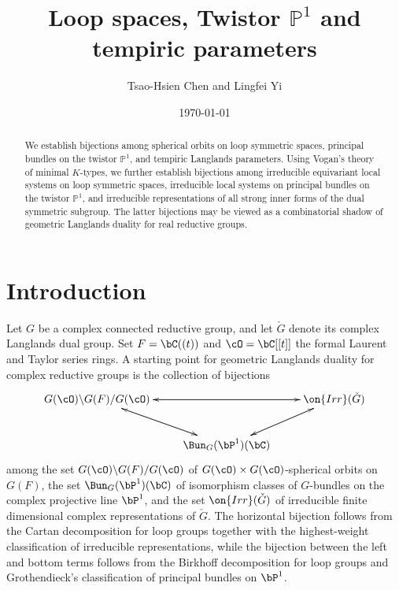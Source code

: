 \documentclass[12pt]{amsart}
\theoremstyle{remark}
\begin{document}
 
\renewcommand{\thepart}{\Roman{part}}

\renewcommand{\partname}{\hspace*{20mm} Part}
	

\title{Loop spaces, Twistor $\mathbb P^1$ and tempiric parameters} 
\date{\today} 




 \author{Tsao-Hsien Chen and Lingfei Yi}

\dedicatory{}


         

\maketitle
\begin{abstract}

We establish bijections among spherical orbits on loop symmetric spaces, principal bundles on the twistor $\mathbb P^1$, and tempiric Langlands parameters. Using Vogan's theory of minimal $K$-types, we further establish bijections among irreducible equivariant local systems on loop symmetric spaces, irreducible local systems on principal bundles on the twistor $\mathbb P^1$, and irreducible representations of all strong inner forms of the dual symmetric subgroup. The latter bijections may be viewed as a combinatorial shadow of geometric Langlands duality for real reductive groups.
    
\end{abstract}
\setcounter{tocdepth}{1}
\tableofcontents

\section{Introduction}
Let $G$ be a complex connected reductive group, and let $\check G$ denote its complex Langlands dual group. 
Set $F=\bC((t))$ and $\cO=\bC[[t]]$ the formal Laurent and Taylor series rings.
A starting point for geometric Langlands duality for complex reductive groups is the collection of bijections
\begin{equation}\label{complex groups}
    \xymatrix{G(\cO)\backslash G(F)/G(\cO)\ar[rr]\ar[dr]&&\on{Irr}(\check G)\ar[dl]\ar[ll]\\
&\Bun_G(\bP^1)(\bC)\ar[ul]\ar[ur]&}
\end{equation}
among the set $G(\cO)\backslash G(F)/G(\cO)$ of $G(\cO)\times G(\cO)$-spherical orbits on $G(F)$, the set $\Bun_G(\bP^1)(\bC)$  of isomorphism classes of $G$-bundles on the complex projective line $\bP^1$, and the set $\on{Irr}(\check G)$ of irreducible finite dimensional complex representations of $\check G$. The horizontal bijection follows from the Cartan decomposition for loop groups together with the highest-weight classification of irreducible representations, while the bijection between the left and bottom terms follows from the Birkhoff decomposition for loop groups and Grothendieck's classification of principal bundles on $\bP^1$.
\end{document}
